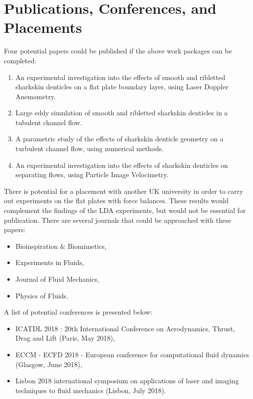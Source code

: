 \documentclass[12pt,oneside,a4paper]{article}
\begin{document}
\section{Publications, Conferences, and Placements}
Four potential papers could be published if the above work packages can be completed:
\begin{enumerate}
\itemsep0em

\item An experimental investigation into the effects of smooth and ribletted sharkskin denticles on a flat plate boundary layer, using Laser Doppler Anemometry.

\item Large eddy simulation of smooth and ribletted sharkskin denticles in a tubulent channel flow.

\item A parametric study of the effects of sharkskin denticle geometry on a turbulent channel flow, using numerical methods. 

\item An experimental investigation into the effects of sharkskin denticles on separating flows, using Particle Image Velocimetry. 
\end{enumerate}
There is potential for a placement with another UK university in order to carry out experiments on the flat plates with force balances. These results would complement the findings of the LDA experiments, but would not be essential for publication. There are several journals that could be approached with these papers:
\begin{itemize}
\itemsep0em
\item Bioinspiration \& Biomimetics,
\item Experiments in Fluids,
\item Journal of Fluid Mechanics,
\item Physics of Fluids.
\end{itemize}
A list of potential conferences is presented below:
\begin{itemize}
\itemsep0em
\item ICATDL 2018 : 20th International Conference on Aerodynamics, Thrust, Drag and Lift (Paris, May 2018),
\item ECCM - ECFD 2018 - European conference for computational fluid dynamics (Glasgow, June 2018),
\item Lisbon 2018 international symposium on applications of laser and imaging techniques to fluid mechanics (Lisbon, July 2018).
\end{itemize}
\end{document}
